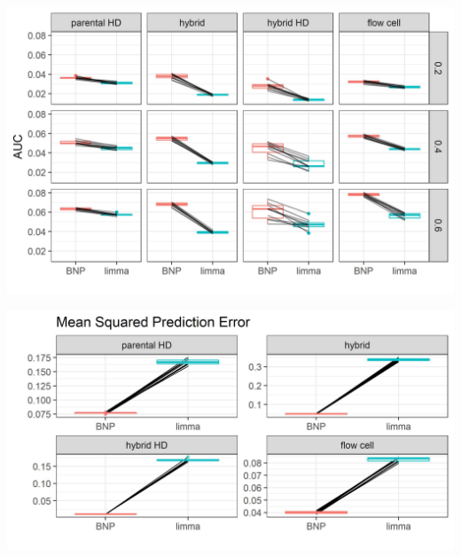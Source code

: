 \documentclass[handout]{beamer}
\begin{document}
\begin{frame}
\includegraphics[width=\textwidth]{ss1-auc}
\end{frame}

\begin{frame}%
\includegraphics[width=\textheight]{ss1-mspe}
\end{frame}
\end{document}

